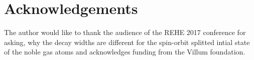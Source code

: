 \section{Acknowledgements}
The author would like to thank the audience of the REHE 2017 conference for
asking, why the decay widths are different for the spin-orbit splitted intial
state of the noble gas atoms and acknowledges funding from the Villum foundation.
